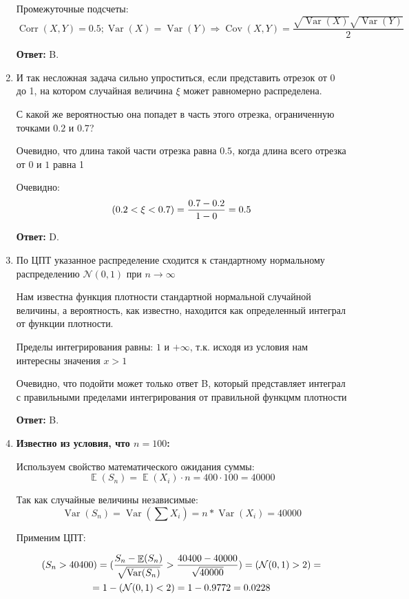 \documentclass[a4paper]{article} %
\DeclareMathOperator{\Var}{Var}
\DeclareMathOperator{\Cov}{Cov}
\DeclareMathOperator{\Corr}{Corr}
\DeclareMathOperator{\E}{\mathbb{E}}
\let\P\relax
\DeclareMathOperator{\P}{\mathbb{P}}
\newcommand{\cN}{\mathcal{N}}
\begin{document}
\begin{enumerate}
    
    Промежуточные подсчеты: 
    \[
    \Corr(X,Y) = 0.5; \Var(X) = \Var(Y) \Rightarrow \Cov(X,Y) = \frac{\sqrt{\Var(X)}\sqrt{\Var(Y)}}{2}
    \]
    
    \textbf{Ответ:} B.
    
    
    \item
    И так несложная задача сильно упроститься, если представить отрезок от 0 до 1, на котором случайная величина $\xi$ может равномерно распределена. 
    
    С какой же вероятностью она попадет в часть этого отрезка, ограниченную точками $0.2$ и $0.7$?
    
    Очевидно, что длина такой части отрезка равна $0.5$, когда длина всего отрезка от $0$ и $1$ равна 1
    
    Очевидно: 
    \[
    \P(0.2 < \xi < 0.7) = \frac{0.7 - 0.2}{1 - 0} = 0.5
    \]
    
    \textbf{Ответ:} D.
    
    
    \item
    По ЦПТ указанное распределение сходится к стандартному нормальному распределению $\cN(0,1)$ при $n \rightarrow \infty$
    
    Нам известна функция плотности стандартной нормальной случайной величины, а вероятность, как известно, находится как определенный интеграл от функции плотности. 
    
    Пределы интегрирования равны: $1$ и ${+\infty}$, т.к. исходя из условия нам интересны значения $x > 1$
    
    Очевидно, что подойти может только ответ B, который представляет интеграл с правильными пределами интегрирования от правильной функцмм плотности
    
    \textbf{Ответ:} B.
    
    
    \item
    \textbf{Известно из условия, что $n = 100$:}
    
    Используем свойство математического ожидания суммы:
    \[
    \E(S_n) = \E(X_i) \cdot n = 400 \cdot 100 = 40000
    \]
    
    Так как случайные величины независимые:
    \[
    \Var(S_n) = \Var(\sum X_i) = n * \Var(X_i) = 40000
    \]
    
    
    
    Применим ЦПТ:
    
    \[
    \begin{gathered} \P(S_n > 40400) = \P(\frac{S_n - \E(S_n)}{\sqrt{\Var(S_n)}} > \frac{40400 - 40000}{\sqrt{40000}}) = \P(\cN(0,1) > 2)= \\
    = 1 -\P(\cN(0,1) < 2) = 1 - 0.9772 = 0.0228 \end{gathered}
    \]
    

\end{enumerate}
\end{document}
